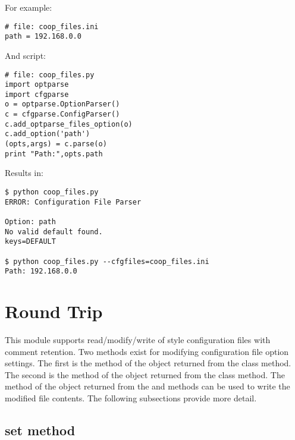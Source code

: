 \documentclass{howto}
\begin{document}
For example:

\begin{verbatim}
# file: coop_files.ini
path = 192.168.0.0
\end{verbatim}

And script:

\begin{verbatim}
# file: coop_files.py
import optparse
import cfgparse
o = optparse.OptionParser()
c = cfgparse.ConfigParser()
c.add_optparse_files_option(o)
c.add_option('path')
(opts,args) = c.parse(o)
print "Path:",opts.path
\end{verbatim}

Results in:

\begin{verbatim}
$ python coop_files.py
ERROR: Configuration File Parser

Option: path
No valid default found.
keys=DEFAULT

$ python coop_files.py --cfgfiles=coop_files.ini
Path: 192.168.0.0
\end{verbatim}

\section{Round Trip}

This module supports read/modify/write of  style configuration files
with comment retention.  Two methods exist for modifying configuration file
option settings.  The first is the  method of the object returned 
from the  class  method.  The second
is the  method of the object returned from the 
 class  method.  The  method
of the object returned from the  and  methods can be
used to write the modified file contents.  The following subsections provide
more detail.

\subsection{set method\label{cfgparse-round-trip-set}}
\end{document}
